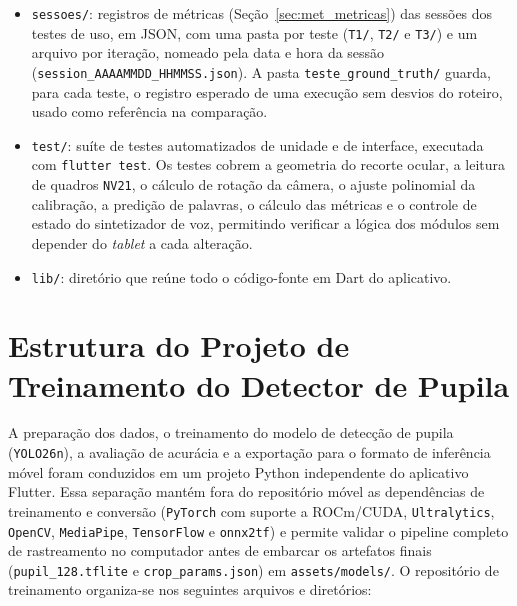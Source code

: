 \begin{itemize}
    \item \texttt{sessoes/}: registros de métricas (Seção~\ref{sec:met_metricas}) das sessões dos testes de uso, em JSON, com uma pasta por teste (\texttt{T1/}, \texttt{T2/} e \texttt{T3/}) e um arquivo por iteração, nomeado pela data e hora da sessão (\texttt{session\_\allowbreak AAAAMMDD\_\allowbreak HHMMSS.json}). A pasta \texttt{teste\_\allowbreak ground\_\allowbreak truth/} guarda, para cada teste, o registro esperado de uma execução sem desvios do roteiro, usado como referência na comparação.
    \item \texttt{test/}: suíte de testes automatizados de unidade e de interface, executada com \texttt{flutter test}. Os testes cobrem a geometria do recorte ocular, a leitura de quadros \texttt{NV21}, o cálculo de rotação da câmera, o ajuste polinomial da calibração, a predição de palavras, o cálculo das métricas e o controle de estado do sintetizador de voz, permitindo verificar a lógica dos módulos sem depender do \textit{tablet} a cada alteração.
    \item \texttt{lib/}: diretório que reúne todo o código-fonte em Dart do aplicativo.
\end{itemize}

\section{Estrutura do Projeto de Treinamento do Detector de Pupila} \label{sec:projeto_treinamento}

A preparação dos dados, o treinamento do modelo de detecção de pupila (\texttt{YOLO26n}), a avaliação de acurácia e a exportação para o formato de inferência móvel foram conduzidos em um projeto Python independente do aplicativo Flutter. Essa separação mantém fora do repositório móvel as dependências de treinamento e conversão (\texttt{PyTorch} com suporte a ROCm/CUDA, \texttt{Ultralytics}, \texttt{OpenCV}, \texttt{MediaPipe}, \texttt{TensorFlow} e \texttt{onnx2tf}) e permite validar o pipeline completo de rastreamento no computador antes de embarcar os artefatos finais (\texttt{pupil\_128.tflite} e \texttt{crop\_params.json}) em \texttt{assets/models/}. O repositório de treinamento organiza-se nos seguintes arquivos e diretórios:

